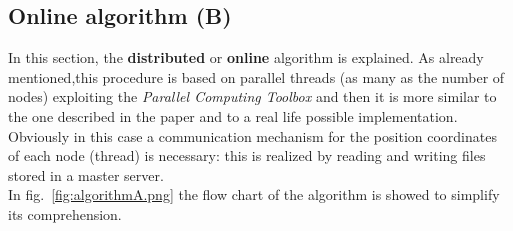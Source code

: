 \documentclass[a4paper,11pt,oneside]{book}
\begin{document}
\newpage %
	
\subsection{Online algorithm (B)}
	
In this section, the \textbf{distributed} or \textbf{online} algorithm is explained. As already mentioned,this procedure is based on parallel threads (as many as the number of nodes) exploiting the \textit{Parallel Computing Toolbox} and then it is more similar to the one described in the paper \cite{K1} and to a real life possible implementation. Obviously in this case a communication mechanism for the position coordinates of each node (thread) is necessary: this is realized by reading and writing files stored in a master server.\\
In fig.~\ref{fig:algorithmA.png} the flow chart of the algorithm is showed to simplify its comprehension.\\
\end{document}
